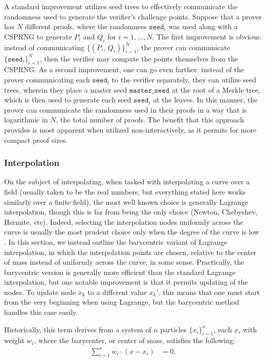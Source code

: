 \documentclass[11pt,letterpaper]{article}
\theoremstyle{definition}
\newcommand{\6}{\mathbf}
\newcommand{\7}{\mathcal}
\begin{document}
A standard improvement utilizes seed trees to effectively communicate the randomness used to generate the verifier's challenge points.
Suppose that a prover has $N$ different proofs, where the randomness $\texttt{seed}_i$ was used along with a CSPRNG to generate $P_i$ and $Q_i$ for $i=1, \dots, N$.
The first improvement is obvious: instead of communicating $\{(P_i, \, Q_i)\}_{i=1}^N$, the prover can communicate $\{\texttt{seed}_i\}_{i=1}^N$, then the verifier may compute the points themselves from the CSPRNG.
As a second improvement, one can go even farther: instead of the prover communicating each $\texttt{seed}_i$ to the verifier separately, they can utilize seed trees, wherein they place a master seed $\texttt{master\_seed}$ at the root of a Merkle tree, which is then used to generate each seed $\texttt{seed}_i$ at the leaves.
In this manner, the prover can communicate the randomness used in their proofs in a way that is logarithmic in $N$, the total number of proofs.
The benefit that this approach provides is most apparent when utilized non-interactively, as it permits for more compact proof sizes.






\subsubsection{Interpolation}

On the subject of interpolating, when tasked with interpolating a curve over a field (usually taken to be the real numbers, but everything stated here works similarly over a finite field), the most well known choice is generally Lagrange interpolation, though this is far from being the only choice (Newton, Chebyshev, Hermite, etc). 
Indeed, selecting the interpolation nodes uniformly across the curve is usually the most prudent choice only when the degree of the curve is low \cite{Trefethen}.
In this section, we instead outline the barycentric variant of Lagrange interpolation, in which the interpolation points are chosen, relative to the center of mass instead of uniformly across the curve, in some sense.
Practically, the barycentric version is generally more efficient than the standard Lagrange interpolation, but one notable improvement is that it permits updating of the nodes. 
To update node $x_k$ to a different value $x_k'$, this means that one must start from the very beginning when using Lagrange, but the barycentric method handles this case easily.

Historically, this term derives from a system of $n$ particles $\{x_i\}_{i=1}^n$, each $x_i$ with weight $w_i$, where the barycenter, or center of mass, satisfies the following:
\begin{align}\label{BarycentricEqn}
    \sum_{i=1}^n w_i \cdot (x - x_i) &= 0. 
\end{align}
\end{document}
